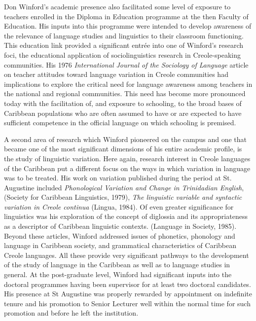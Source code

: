 \documentclass[output=paper, colorlinks,citecolor=brown]{langscibook}
\begin{document}
Don Winford’s academic presence also facilitated some level of exposure to teachers enrolled in the Diploma in Education programme at the then Faculty of Education. His inputs into this programme were intended to develop awareness of the relevance of language studies and linguistics to their classroom functioning.
This education link provided a significant entrée into one of Winford’s research foci, the educational application of sociolinguistics research in Creole-speaking communities. His 1976 \textit{International Journal of the Sociology of Language} article on teacher attitudes toward language variation in Creole communities had implications to explore the critical need for language awareness among teachers in the national and regional communities. This need has become more pronounced today with the facilitation of, and exposure to schooling, to the broad bases of Caribbean populations who are often assumed to have or are expected to have sufficient competence in the official language on which schooling is premised.  

A second area of research which Winford pioneered on the campus and one that became one of the most significant dimensions of his entire academic profile, is the study of linguistic variation. Here again, research interest in Creole languages of the Caribbean put a different focus on the ways in which variation in language was to be treated. His work on variation published during the period at St. Augustine included \textit{Phonological Variation and Change in Trinidadian English}, (Society for Caribbean Linguistics, 1979), \textit{The linguistic variable and syntactic variation in Creole continua} (Lingua, 1984). Of even greater significance for linguistics was his exploration of the concept of diglossia and its appropriateness as a descriptor of Caribbean linguistic contexts. (Language in Society, 1985). Beyond these articles, Winford addressed issues of phonetics, phonology and language in Caribbean society, and grammatical characteristics of Caribbean Creole languages. All these provide very significant pathways to the development of the study of language in the Caribbean as well as to language studies in general. At the post-graduate level, Winford had significant inputs into the doctoral programmes having been supervisor for at least two doctoral candidates. His presence at St Augustine was properly rewarded by appointment on indefinite tenure and his promotion to Senior Lecturer well within the normal time for such promotion and before he left the institution. 
\end{document}
